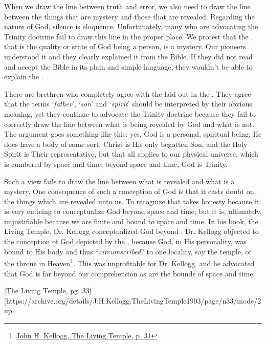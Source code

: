 When we draw the line between truth and error, we also need to draw the line between the things that are mystery and those that are revealed. Regarding the nature of God, silence is eloquence. Unfortunately, many who are advocating the Trinity doctrine fail to draw this line in the proper place. We protest that the , that is the quality or state of God being a person, is a mystery. Our pioneers understood it and they clearly explained it from the Bible. If they did not read and accept the Bible in its plain and simple language, they wouldn’t be able to explain the .

There are brethren who completely agree with the  laid out in the . They agree that the terms ‘\textit{father}’, ‘\textit{son}’ and ‘\textit{spirit}’ should be interpreted by their obvious meaning, yet they continue to advocate the Trinity doctrine because they fail to correctly draw the line between what is being revealed by God and what is not. The argument goes something like this: yes, God is a personal, spiritual being; He does have a body of some sort, Christ is His only begotten Son, and the Holy Spirit is Their representative, but that all applies to our physical universe, which is cumbered by space and time; beyond space and time, God is Trinity.

Such a view fails to draw the line between what is revealed and what is a mystery. One consequence of such a conception of God is that it casts doubt on the things which are revealed unto us. To recognize that takes honesty because it is very enticing to conceptualize God beyond space and time, but it is, ultimately, unjustifiable because we are finite and bound to space and time. In his book, the Living Temple, Dr. Kellogg conceptualized God beyond . Dr. Kellogg objected to the conception of God depicted by the , because God, in His personality, was bound to His body and thus “\textit{circumscribed}” to one locality, say the temple, or the throne in Heaven\footnote{\href{https://archive.org/details/J.H.Kellogg.TheLivingTemple1903/page/n31/mode/2up}{John H. Kellogg, The Living Temple, p. 31}}. This was unprofitable for Dr. Kellogg, and he advocated that God is far beyond our comprehension as are the bounds of space and time.

[The Living Temple, pg. 33][https://archive.org/details/J.H.Kellogg.TheLivingTemple1903/page/n33/mode/2up]

